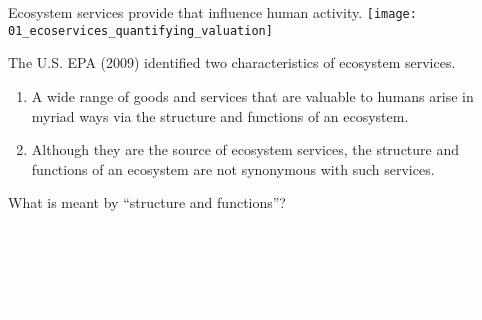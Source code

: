 \documentclass[t]{beamer}
\begin{document}

\begin{frame}[t]{Ecosystem services provide  that influence human activity.}
	\texttt{[image: 01\_ecoservices\_quantifying\_valuation]}
\end{frame}

\begin{frame}[t]{The U.S. EPA (2009) identified two characteristics of ecosystem services.}

	\begin{enumerate}

	\item A wide range of goods and services that are valuable to humans arise in myriad ways via the structure and functions of an ecosystem.

	\vspace*{\baselineskip}
		
	\item Although they are the source of ecosystem services, the structure and functions of an ecosystem are not synonymous with such services.
	
	\end{enumerate}
	
	\hangpara What is meant by “structure and functions”?

\end{frame}


{
\begin{frame}[b]{\textcolor{white}{Can you find Bonaire?}}

\hfill\tiny\textcolor{white}{kmusser, Wikimedia Commons.}
\end{frame}
}


{
\begin{frame}[b]

\hfill\tiny\textcolor{white}{Rebe Leubert, Flickr Creative Commons.}
\end{frame}
}
\end{document}
